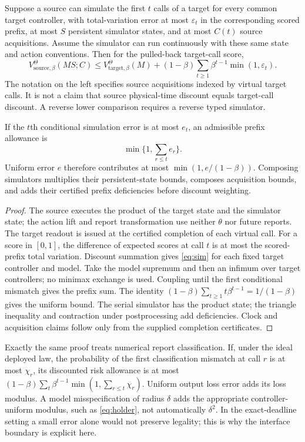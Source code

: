 \begin{theorem}\label{thm:simulation}
Suppose a source can simulate the first $t$ calls of a target for every common target controller, with total-variation error at most $\varepsilon_t$ in the corresponding scored prefix, at most $S$ persistent simulator states, and at most $C(t)$ source acquisitions. Assume the simulator can run continuously with these same state and action conventions. Then for the pulled-back target-call score,
\begin{equation}\label{eq:sim}
 V_{\mathrm{source},\beta}^{\Theta}(MS;C)
 \le V_{\mathrm{target},\beta}^{\Theta}(M)
       +(1-\beta)\sum_{t\ge1}\beta^{t-1}\min(1,\varepsilon_t).
\end{equation}
The notation on the left specifies source acquisitions indexed by virtual target calls. It is not a claim that source physical-time discount equals target-call discount. A reverse lower comparison requires a reverse typed simulator.

If the $t$th conditional simulation error is at most $e_t$, an admissible prefix allowance is
\[\min\{1,\sum_{r\le t}e_r\}.\]
Uniform error $e$ therefore contributes at most $\min(1,e/(1-\beta))$. Composing simulators multiplies their persistent-state bounds, composes acquisition bounds, and adds their certified prefix deficiencies before discount weighting.
\end{theorem}
\begin{proof}
The source executes the product of the target state and the simulator state; the action lift and report transformation use neither $\theta$ nor future reports. The target readout is issued at the certified completion of each virtual call. For a score in $[0,1]$, the difference of expected scores at call $t$ is at most the scored-prefix total variation. Discount summation gives \eqref{eq:sim} for each fixed target controller and model. Take the model supremum and then an infimum over target controllers; no minimax exchange is used. Coupling until the first conditional mismatch gives the prefix sum. The identity $(1-\beta)\sum_{t\ge1}t\beta^{t-1}=1/(1-\beta)$ gives the uniform bound. The serial simulator has the product state; the triangle inequality and contraction under postprocessing add deficiencies. Clock and acquisition claims follow only from the supplied completion certificates.
\end{proof}

Exactly the same proof treats numerical report classification. If, under the ideal deployed law, the probability of the first classification mismatch at call $r$ is at most $\chi_r$, its discounted risk allowance is at most
$(1-\beta)\sum_t\beta^{t-1}\min(1,\sum_{r\le t}\chi_r)$.
Uniform output loss error adds its loss modulus. A model misspecification of radius $\delta$ adds the appropriate controller-uniform modulus, such as \eqref{eq:holder}, not automatically $\delta^2$. In the exact-deadline setting a small error alone would not preserve legality; this is why the interface boundary is explicit here.

